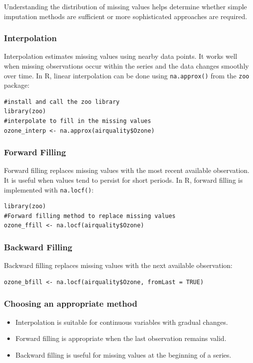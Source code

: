 \documentclass[12pt,a4paper]{article}
\begin{document}
Understanding the distribution of missing values helps determine whether simple imputation methods are sufficient or more sophisticated approaches are required.

\subsubsection{Interpolation}

Interpolation estimates missing values using nearby data points. It works well when missing observations occur within the series and the data changes smoothly over time. In R, linear interpolation can be done using \texttt{na.approx()} from the \texttt{zoo} package:

\begin{verbatim}
#install and call the zoo library
library(zoo)
#interpolate to fill in the missing values
ozone_interp <- na.approx(airquality$Ozone)
\end{verbatim}

\subsubsection{Forward Filling}

Forward filling replaces missing values with the most recent available observation. It is useful when values tend to persist for short periods. In R, forward filling is implemented with \texttt{na.locf()}:

\begin{verbatim}
library(zoo)
#Forward filling method to replace missing values
ozone_ffill <- na.locf(airquality$Ozone)
\end{verbatim}

\subsubsection{Backward Filling}

Backward filling replaces missing values with the next available observation:

\begin{verbatim}
ozone_bfill <- na.locf(airquality$Ozone, fromLast = TRUE)
\end{verbatim}

\subsubsection{Choosing an appropriate method}

\begin{itemize}
    \item Interpolation is suitable for continuous variables with gradual changes.
    \item Forward filling is appropriate when the last observation remains valid.
    \item Backward filling is useful for missing values at the beginning of a series.
\end{itemize}
\end{document}
